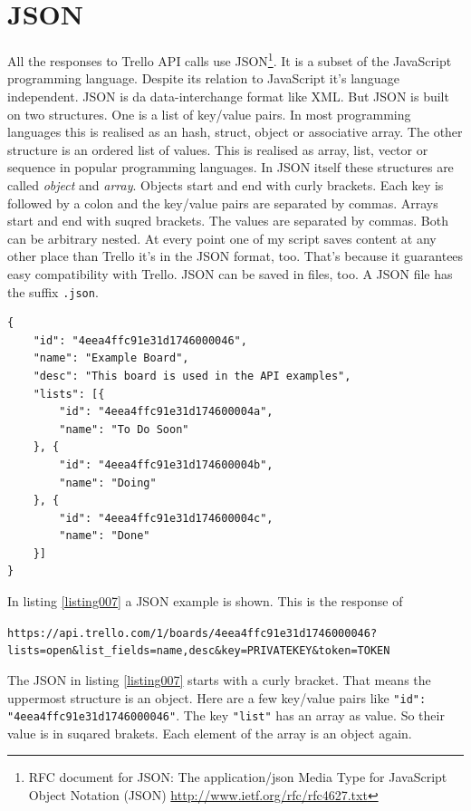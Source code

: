 \section{JSON}
All the responses to Trello API calls use JSON\footnote{RFC document for JSON: The application/json Media Type for JavaScript Object Notation (JSON)  \url{http://www.ietf.org/rfc/rfc4627.txt}}. It is a subset of the JavaScript programming language. Despite its relation to JavaScript it's language independent. JSON is da data-interchange format like XML. But JSON is built on two structures. One is a list of key/value pairs. In most programming languages this is realised as an hash, struct, object or associative array. The other structure is an ordered list of values. This is realised as array, list, vector or sequence in popular programming languages. In JSON itself these structures are called \emph{object} and \emph{array}. Objects start and end with curly brackets. Each key is followed by a colon and the key/value pairs are separated by commas. Arrays start and end with suqred brackets. The values are separated by commas. Both can be arbitrary nested. At every point one of my script saves content at any other place than Trello it's in the JSON format, too. That's because it guarantees easy compatibility with Trello. JSON can be saved in files, too. A JSON file has the suffix \texttt{.json}. \cite{json}

\begin{lstlisting}[aboveskip=1\baselineskip, caption=JSON example., label=listing007]
{
    "id": "4eea4ffc91e31d1746000046",
    "name": "Example Board",
    "desc": "This board is used in the API examples",
    "lists": [{
        "id": "4eea4ffc91e31d174600004a",
        "name": "To Do Soon"
    }, {
        "id": "4eea4ffc91e31d174600004b",
        "name": "Doing"
    }, {
        "id": "4eea4ffc91e31d174600004c",
        "name": "Done"
    }]
}
\end{lstlisting}

In listing \ref{listing007} a JSON example is shown. This is the response of

\begin{center}
\texttt{https://api.trello.com/1/boards/4eea4ffc91e31d1746000046? lists=open\&list\_fields=name,desc\&key=PRIVATEKEY\&token=TOKEN}
\end{center}

The JSON in listing \ref{listing007} starts with a curly bracket. That means the uppermost structure is an object. Here are a few key/value pairs like \texttt{"id": "4eea4ffc91e31d1746000046"}. The key \texttt{"list"} has an array as value. So their value is in suqared brakets. Each element of the array is an object again.

